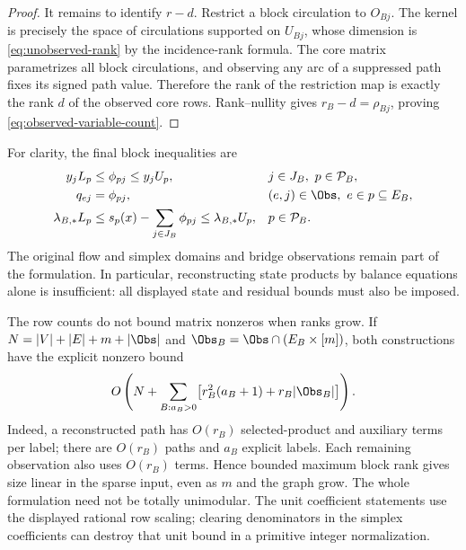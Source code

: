 \begin{proof}
It remains to identify $r-d$. Restrict a block circulation to $O_{Bj}$.
The kernel is precisely the space of circulations supported on $U_{Bj}$,
whose dimension is \eqref{eq:unobserved-rank} by the incidence-rank formula.
The core matrix parametrizes all block circulations, and observing any
arc of a suppressed path fixes its signed path value. Therefore the rank
of the restriction map is exactly the rank $d$ of the observed core rows.
Rank--nullity gives $r_B-d=\rho_{Bj}$, proving
\eqref{eq:observed-variable-count}.
\end{proof}

For clarity, the final block inequalities are
\begin{align}
 y_jL_p&\le\phi_{pj}\le y_jU_p,
       &&j\in J_B,\ p\in\mathcal P_B,\label{eq:observed-state-bounds}\\
 q_{ej}&=\phi_{pj},
       &&(e,j)\in\Obs,\ e\in p\subseteq E_B,\label{eq:observed-equalities}\\
 \lambda_{B,*}L_p&\le s_p(x)-\sum_{j\in J_B}\phi_{pj}
                       \le\lambda_{B,*}U_p,
       &&p\in\mathcal P_B.\label{eq:observed-residual-bounds}
\end{align}
The original flow and simplex domains and bridge observations remain part
of the formulation. In particular, reconstructing state products by balance
equations alone is insufficient: all displayed state and residual bounds
must also be imposed.

The row counts do not bound matrix nonzeros when ranks grow. If
$N=|V|+|E|+m+|\Obs|$ and $\Obs_B=\Obs\cap(E_B\times[m])$, both
constructions have the explicit nonzero bound
\begin{equation}\label{eq:compression-nonzeros}
 O\left(N+\sum_{B:a_B>0}
       \bigl[r_B^2(a_B+1)+r_B|\Obs_B|\bigr]\right).
\end{equation}
Indeed, a reconstructed path has $O(r_B)$ selected-product and auxiliary
terms per label; there are $O(r_B)$ paths and $a_B$ explicit labels.
Each remaining observation also uses $O(r_B)$ terms. Hence bounded maximum
block rank gives size linear in the sparse input, even as $m$ and the graph
grow. The whole formulation need not be totally unimodular.
The unit coefficient statements use the displayed rational row scaling;
clearing denominators in the simplex coefficients can destroy that unit
bound in a primitive integer normalization.

